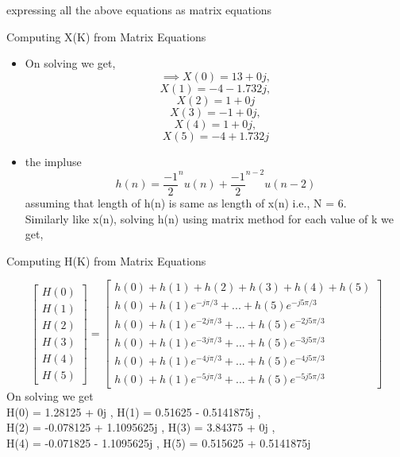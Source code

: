 \documentclass[english,10pt]{beamer}
\begin{document}
{\begin{frame}{expressing all the above equations as matrix equations}
\end{frame}
 \begin{frame}{Computing X(K) from Matrix Equations}
  \begin{itemize}
      \item
On solving we get,
\[\implies X(0) = 13 + 0j,\]
\[X(1) = -4 - 1.732j,\]
\[X(2) = 1 + 0j\]
\[X(3) = -1 + 0j,\]
\[X(4) = 1 + 0j,\]
\[X(5) = -4 + 1.732j\]
\item the impluse
\[
 h(n)=\frac{-1}{2}^nu(n) + \frac{-1}{2}^{n-2}u(n-2)
\]
assuming that length of h(n) is same as length of x(n) i.e., N = 6.\\
Similarly like x(n), solving h(n) using matrix method for each value of k we get,
  \end{itemize}  
\end{frame}

\begin{frame}{Computing H(K) from Matrix Equations}

       \[
    \begin{bmatrix} H(0) \\ H(1) \\ H(2) \\ H(3) \\ H(4) \\ H(5) \end{bmatrix}
=
\begin{bmatrix}
h(0) + h(1) + h(2) + h(3) + h(4) + h(5) \\h(0) + h(1)e^{-j\pi /3} + ... + h(5)e^{-j5\pi /3}\\h(0) + h(1)e^{-2j\pi /3} + ... + h(5)e^{-2j5\pi /3}\\h(0) + h(1)e^{-3j\pi /3} + ... + h(5)e^{-3j5\pi /3}\\
h(0) + h(1)e^{-4j\pi /3} + ... + h(5)e^{-4j5\pi /3}\\h(0) + h(1)e^{-5j\pi /3} + ... + h(5)e^{-5j5\pi /3}
\end{bmatrix}
\]
 On solving we get\\
H(0) = 1.28125 + 0j \;,
H(1) = 0.51625 - 0.5141875j \; ,\\
H(2) = -0.078125 + 1.1095625j \;,
H(3) = 3.84375 + 0j \;,\\
H(4) = -0.071825 - 1.1095625j \;,
H(5) = 0.515625 + 0.5141875j

\end{frame}

}
\end{document}
